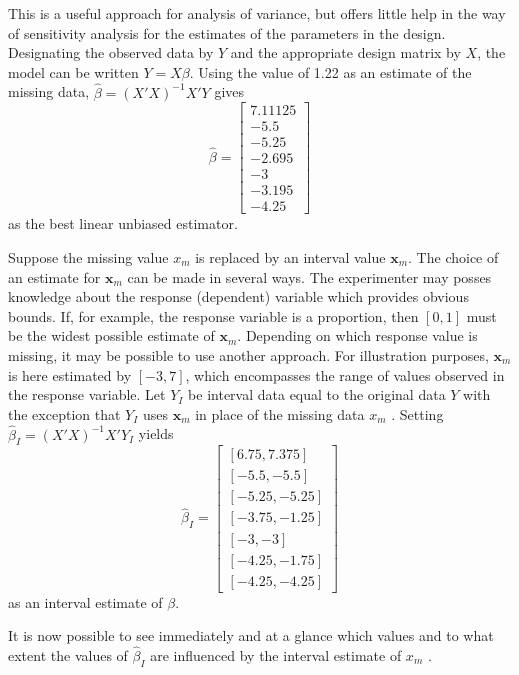 This is a useful approach for analysis of variance, but offers little help in
the way of sensitivity analysis for the estimates of the parameters in the
design. Designating the  
observed data by $Y$ and the appropriate design matrix by $X$, the model can
be written  $Y = X\beta$. Using the value of 1.22 as an estimate of the
missing data, $\hat{\beta} = (X'X)^{-1}X'Y$ gives
$$
\hat{\beta} = \left[ 
 \begin{array}{c}
7.11125 \\
-5.5 \\
-5.25 \\
-2.695 \\
- 3 \\
- 3.195 \\
-4.25 
\end{array} \right]
$$
as the best linear unbiased estimator. 

Suppose the missing value $x_m$ is replaced by an interval value 
$\mathbf{x}_m$. The choice of an 
estimate for $\mathbf{x}_m$ 
can be made in several ways. The experimenter may posses knowledge 
about the response (dependent) variable which provides obvious bounds. If, for
example, the response variable is a proportion, then $[0, 1]$ 
must be the widest possible estimate of 
$\mathbf{x}_m$. 
Depending on which response value is missing, it may be possible to use another 
approach. For illustration purposes, $\mathbf{x}_m$ 
is here estimated by $[-3, 7]$, which encompasses 
the range of values observed in the response variable. Let $Y_I$ 
be interval data equal to 
the original data $Y$ with the exception that $Y_I$ 
uses $\mathbf{x}_m$ in place of the missing data $x_m$ . 
Setting $\hat{\beta}_I = (X'X)^{-1}X'Y_I$ yields
$$
\hat{\beta}_I = \left[ 
 \begin{array}{c}
\left[6.75, 7.375\right]\\
\left[-5.5, -5.5\right] \\
\left[-5.25, -5.25\right]\\
\left[-3.75, -1.25\right] \\
\left[-3, -3\right] \\
\left[-4.25, -1.75\right] \\
\left[-4.25, -4.25\right]
\end{array} \right]
$$
as an interval estimate of $\beta$.

It is now possible to see immediately and at a glance which values and to what
extent the values of $\hat{\beta}_I$
are influenced by the interval estimate of $x_m$ . 

